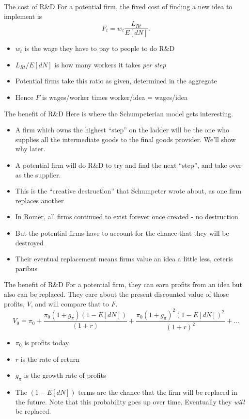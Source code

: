 \begin{frame}{The cost of R\&D}
For a potential firm, the fixed cost of finding a new idea to implement is
\begin{equation}
	F_t = w_t \frac{L_{Rt}}{E[dN]}.
\end{equation}
\begin{itemize}
	\item $w_t$ is the wage they have to pay to people to do R\&D
	\item $L_{Rt}/E[dN]$ is how many workers it takes \textit{per step}
	\item Potential firms take this ratio as given, determined in the aggregate
	\item Hence $F$ is wages/worker times worker/idea = wages/idea
\end{itemize}
\end{frame}

\begin{frame}{The benefit of R\&D}
Here is where the Schumpeterian model gets interesting. 
\begin{itemize}
	\item A firm which owns the highest ``step'' on the ladder will be the one who supplies all the intermediate goods to the final goods provider. We'll show why later.
	\item A potential firm will do R\&D to try and find the next ``step'', and take over as the supplier.
	\item This is the ``creative destruction'' that Schumpeter wrote about, as one firm replaces another
	\item In Romer, all firms continued to exist forever once created - no destruction
	\item But the potential firms have to account for the chance that they will be destroyed
	\item Their eventual replacement means firms value an idea a little less, ceteris paribus
\end{itemize}

\end{frame}

\begin{frame}{The benefit of R\&D}
For a potential firm, they can earn profits from an idea but also can be replaced. They care about the present discounted value of those profits, $V$, and will compare that to $F$.
\begin{equation}
	V_0 = \pi_0 + \frac{\pi_0(1+g_{\pi})(1-E[dN])}{(1+r)} + \frac{\pi_0(1+g_{\pi})^2(1-E[dN])^2}{(1+r)^2}+ ... \nonumber
\end{equation}
\begin{itemize}
	\item $\pi_0$ is profits today
	\item $r$ is the rate of return
	\item $g_{\pi}$ is the growth rate of profits
	\item The $(1-E[dN])$ terms are the chance that the firm will be replaced in the future. Note that this probability goes up over time. Eventually they \textit{will} be replaced.
\end{itemize}

\end{frame}

